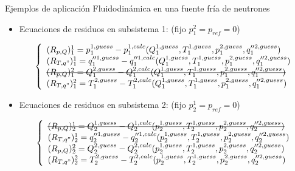 \begin{frame}
{Ejemplos de aplicación}
{Fluidodinámica en una fuente fría de neutrones}

\begin{itemize}
\item Ecuaciones de residuos en subsistema 1: (fijo $p_1^2=p_{ref}=0$)

\begin{equation*}
\left\{ \begin{array}{l}
(R_{p,Q})_{1}^{1}  = p_1^{1, guess} - p_1^{1, calc}(Q_1^{1, guess}, T_1^{1, guess}, p_1^{2, guess}, q_1''^{2, guess}) \\
(R_{T,q"})_{1}^{1} = q_{1}''^{1, guess} - q_{1}''^{1, calc}(Q_1^{1, guess}, T_1^{1, guess}, p_1^{2, guess}, q_1''^{2, guess}) \\
$\sout{$(R_{p,Q})_{1}^{2} = Q_1^{2, guess} - Q_1^{2, calc}(Q_1^{1, guess}, T_1^{1, guess}, p_1^{2, guess}, q_1''^{2, guess})$}$ \\
(R_{T,q"})_{1}^{2} = T_1^{2, guess} - T_1^{2, calc}(Q_1^{1, guess}, T_1^{1, guess}, p_1^{2, guess}, q_1''^{2, guess})
\end{array}
\right.
\label{residuos-1}
\end{equation*}

\item Ecuaciones de residuos en subsistema 2: (fijo $p_2^1=p_{ref}=0$)

\begin{equation*}
\left\{ \begin{array}{l}
$\sout{$(R_{p,Q})_{2}^{1}  = Q_2^{1, guess} - Q_2^{1, calc}(p_2^{1, guess}, T_2^{1, guess}, p_2^{2, guess}, q_2''^{2, guess})$}$  \\
(R_{T,q"})_{2}^{1} = q_{2}''^{1, guess} - q_{2}''^{1, calc}(p_2^{1, guess}, T_2^{1, guess}, p_2^{2, guess}, q_2''^{2, guess}) \\
(R_{p,Q})_{2}^{2}  = Q_2^{2, guess} - Q_2^{2, calc}(p_2^{1, guess}, T_2^{1, guess}, p_2^{2, guess}, q_2''^{2, guess})  \\
(R_{T,q"})_{2}^{2} = T_2^{2, guess} - T_2^{2, calc}(p_2^{1, guess}, T_2^{1, guess}, p_2^{2, guess}, q_2''^{2, guess}) 
\end{array}
\right.
\label{residuos-2}
\end{equation*}

\end{itemize}

\end{frame}


